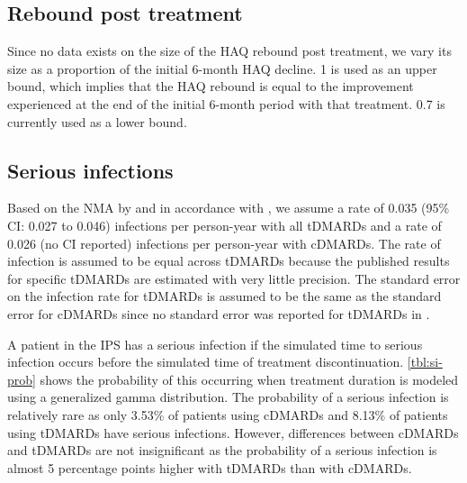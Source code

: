 \documentclass[11pt,final,fleqn]{article}\usepackage[]{graphicx}\usepackage[]{color}
\theoremstyle{plain}
\begin{document}
\FloatBarrier


\subsection{Rebound post treatment}
Since no data exists on the size of the HAQ rebound post treatment, we vary its size as a proportion of the initial 6-month HAQ decline. 1 is used as an upper bound, which implies that the HAQ rebound is equal to the improvement experienced at the end of the initial 6-month period with that treatment. 0.7 is currently used as a lower bound.

\subsection{Serious infections}
Based on the NMA by \citet{singh2011adverse} and in accordance with \citet{stevenson2016adalimumab}, we assume a rate of 0.035 (95\% CI: 0.027 to 0.046) infections per person-year with all tDMARDs and a rate of 0.026 (no CI reported) infections per person-year with cDMARDs. The rate of infection is assumed to be equal across tDMARDs because the published results for specific tDMARDs are estimated with very little precision. The standard error on the infection rate for tDMARDs is assumed to be the same as the standard error for cDMARDs since no standard error was reported for tDMARDs in \citet{singh2011adverse}.



A patient in the IPS has a serious infection if the simulated time to serious infection occurs before the simulated time of treatment discontinuation. \autoref{tbl:si-prob} shows the probability of this occurring when treatment duration is modeled using a generalized gamma distribution. The probability of a serious infection is relatively rare as only 3.53\% of patients using cDMARDs and 8.13\% of patients using tDMARDs have serious infections. However, differences between cDMARDs and tDMARDs are not insignificant as the probability of a serious infection is almost 5 percentage points higher with tDMARDs than with cDMARDs.
\end{document}
